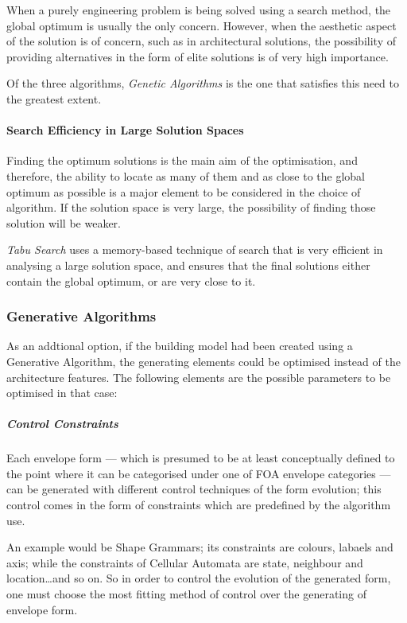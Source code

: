 When a purely engineering problem is being solved using a search method, the global optimum is usually the only concern. However, when the aesthetic aspect of the solution is of concern, such as in architectural solutions, the possibility of providing alternatives in the form of elite solutions is of very high importance.

Of the three algorithms, \emph{Genetic Algorithms} is the one that satisfies this need to the greatest extent.

\paragraph{Search Efficiency in Large Solution Spaces}\mbox{}\vspace{-0.4cm}

Finding the optimum solutions is the main aim of the optimisation, and therefore, the ability to locate as many of them and as close to the global optimum as possible is a major element to be considered in the choice of algorithm. If the solution space is very large, the possibility of finding those solution will be weaker.

\emph{Tabu Search} uses a memory-based technique of search that is very efficient in analysing a large solution space, and ensures that the final solutions either contain the global optimum, or are very close to it.



\subsubsection{Generative Algorithms}

As an addtional option, if the building model had been created using a Generative Algorithm, the generating elements could be optimised instead of the architecture features. The following elements are the possible parameters to be optimised in that case:

\subparagraph{Control Constraints}

Each envelope form --- which is presumed to be at least conceptually defined to the point where it can be categorised under one of FOA envelope categories --- can be generated with different control techniques of the form evolution; this control comes in the form of constraints which are predefined by the algorithm use.

An example would be Shape Grammars; its constraints are colours, labaels and axis; while the constraints of Cellular Automata are state, neighbour and location\ldots and so on. So in order to control the evolution of the generated form, one must choose the most fitting method of control over the generating of envelope form.

